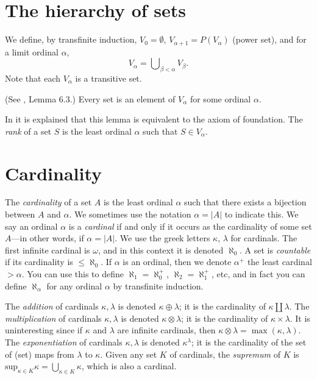 \section{The hierarchy of sets}
\label{section-sets-hierarchy}

\noindent
We define, by transfinite induction, $V_0 = \emptyset$,
$V_{\alpha + 1} = P(V_\alpha)$ (power set),
and for a limit ordinal $\alpha$,
$$
V_\alpha = \bigcup\nolimits_{\beta < \alpha} V_\beta.
$$
Note that each $V_\alpha$ is a transitive set.

\begin{lemma}
\label{lemma-axiom-regularity}
(See \cite{Jech}, Lemma 6.3.)
Every set is an element of $V_\alpha$ for some ordinal $\alpha$.
\end{lemma}

\noindent
In \cite[Chapter III]{Kunen} it is explained that this lemma is
equivalent to the axiom of foundation. The {\it rank} of
a set $S$ is the least ordinal $\alpha$ such that $S \in V_\alpha$.

\section{Cardinality}
\label{section-cardinals}

\noindent
The {\it cardinality} of a set $A$ is the least ordinal $\alpha$
such that there exists a bijection between $A$ and $\alpha$.
We sometimes use the notation $\alpha = |A|$ to indicate this.
We say an ordinal $\alpha$ is a {\it cardinal} if and only
if it occurs as the cardinality of some set $A$---in other words, if
$\alpha = |A|$. We use the greek letters $\kappa$, $\lambda$
for cardinals. The first infinite cardinal is $\omega$, and in this
context it is denoted $\aleph_0$. A set is {\it countable} if its cardinality
is $\leq \aleph_0$. If $\alpha$ is an ordinal, then we denote
$\alpha^+$ the least cardinal $> \alpha$. You can use this to
define $\aleph_1 = \aleph_0^+$, $\aleph_2 = \aleph_1^+$, etc, and
in fact you can define $\aleph_\alpha$ for any ordinal $\alpha$ by
transfinite induction.

\medskip\noindent
The {\it addition} of cardinals $\kappa, \lambda$
is denoted $\kappa \oplus \lambda$; it is the cardinality of
$\kappa \amalg \lambda$. The {\it multiplication} of cardinals
$\kappa, \lambda$ is denoted $\kappa \otimes \lambda$; it is the
cardinality of $\kappa \times \lambda$. It is uninteresting since if
$\kappa$ and $\lambda$ are infinite cardinals, then
$\kappa \otimes \lambda = \max(\kappa, \lambda)$.
The {\it exponentiation}
of cardinals $\kappa, \lambda$ is denoted $\kappa^\lambda$; it is
the cardinality of the set of (set) maps from $\lambda$ to $\kappa$.
Given any set $K$ of cardinals, the {\it supremum} of $K$
is $\text{sup}_{\kappa \in K} \kappa = \bigcup_{\kappa \in K} \kappa$,
which is also a cardinal.

